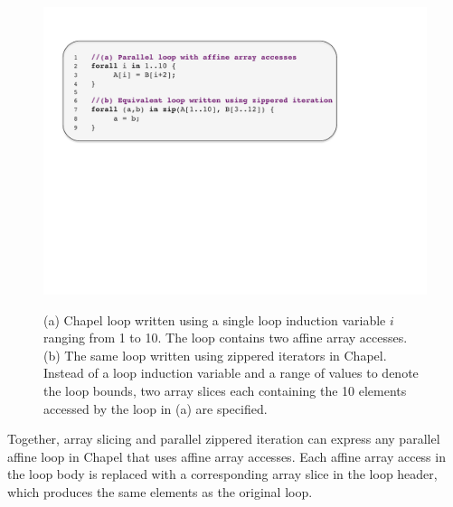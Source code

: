 \begin{figure}
\begin{center}
\includegraphics[width=\linewidth]{./Figures/affine_loop}
\renewcommand{\baselinestretch}{1}
\small\normalsize
\begin{quote}
\caption[Chapel parallel affine loop and its equivalent loop written with zippered iterators]{(a) Chapel loop written using a single loop induction variable $i$ ranging from 1 to 10. The loop contains two affine array accesses. (b) The same loop written using zippered iterators in Chapel. Instead of a loop induction variable and a range of values to denote the loop bounds, two array slices each containing the 10 elements accessed by the loop in (a) are specified.\label{affine_loop}}
\end{quote}
\end{center}
\end{figure}

Together, array slicing and parallel zippered iteration can express any parallel affine loop in Chapel that uses affine array accesses. Each affine array access in the loop body is replaced with a corresponding array slice in the loop header, which produces the same elements as the original loop. 


